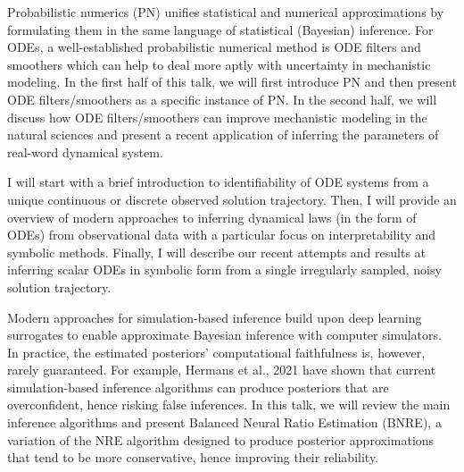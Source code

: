 \documentclass[a4paper,UKenglish]{dagrep-v2021}
\begin{document}
Probabilistic numerics (PN) unifies statistical and numerical approximations by formulating them in the same language of statistical (Bayesian) inference. For ODEs, a well-established probabilistic numerical method is ODE filters and smoothers which can help to deal more aptly with uncertainty in mechanistic modeling. In the first half of this talk, we will first introduce PN and then present ODE filters/smoothers as a specific instance of PN. In the second half, we will discuss how ODE filters/smoothers can improve mechanistic modeling in the natural sciences and present a recent application of inferring the parameters of real-word dynamical system.

\license

I will start with a brief introduction to identifiability of ODE systems from a unique continuous or discrete observed solution trajectory. Then, I will provide an overview of modern approaches to inferring dynamical laws (in the form of ODEs) from observational data with a particular focus on interpretability and symbolic methods. Finally, I will describe our recent attempts and results at inferring scalar ODEs in symbolic form from a single irregularly sampled, noisy solution trajectory.

\license

Modern approaches for simulation-based inference build upon deep learning surrogates to enable approximate Bayesian inference with computer simulators. In practice, the estimated posteriors' computational faithfulness is, however, rarely guaranteed. For example, Hermans et al., 2021 have shown that current simulation-based inference algorithms can produce posteriors that are overconfident, hence risking false inferences. In this talk, we will review the main inference algorithms and present Balanced Neural Ratio Estimation (BNRE), a variation of the NRE algorithm designed to produce posterior approximations that tend to be more conservative, hence improving their reliability.

\license
\end{document}
